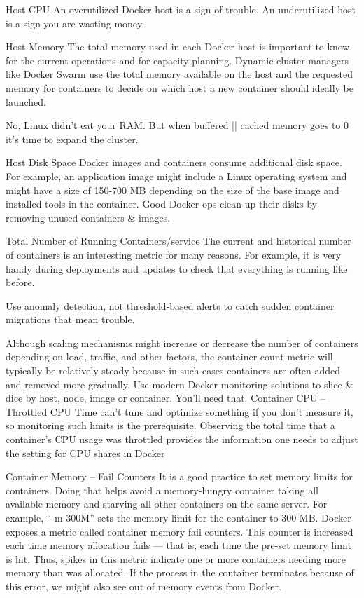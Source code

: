Host CPU
An overutilized Docker host is a sign of trouble.
An underutilized host is a sign you are wasting money.

Host Memory
The total memory used in each Docker host is important to know for the current operations and for capacity planning. Dynamic cluster managers like Docker Swarm use the total memory available on the host and the requested memory for containers to decide on which host a new container should ideally be launched.

No, Linux didn’t eat your RAM.
But when buffered || cached memory goes to 0 it’s time to expand the cluster.

Host Disk Space
Docker images and containers consume additional disk space. For example, an application image might include a Linux operating system and might have a size of 150-700 MB depending on the size of the base image and installed tools in the container.
Good Docker ops clean up their disks by removing unused containers & images.

Total Number of Running Containers/service 
The current and historical number of containers is an interesting metric for many reasons. For example, it is very handy during deployments and updates to check that everything is running like before.

Use anomaly detection, not threshold-based alerts
to catch sudden container migrations that mean trouble.

 Although scaling mechanisms might increase or decrease the number of containers depending on load, traffic, and other factors, the container count metric will typically be relatively steady because in such cases containers are often added and removed more gradually.
Use modern Docker monitoring solutions
to slice & dice by host, node, image or container.
You’ll need that.
Container CPU – Throttled CPU Time
 can’t tune and optimize something if you don’t measure it, so monitoring such limits is the prerequisite. Observing the total time that a container’s CPU usage was throttled provides the information one needs to adjust the setting for CPU shares in Docker

 Container Memory – Fail Counters
 It is a good practice to set memory limits for containers. Doing that helps avoid a memory-hungry container taking all available memory and starving all other containers on the same server. For example, “-m 300M” sets the memory limit for the container to 300 MB. Docker exposes a metric called container memory fail counters. This counter is increased each time memory allocation fails — that is, each time the pre-set memory limit is hit. Thus, spikes in this metric indicate one or more containers needing more memory than was allocated. If the process in the container terminates because of this error, we might also see out of memory events from Docker.


